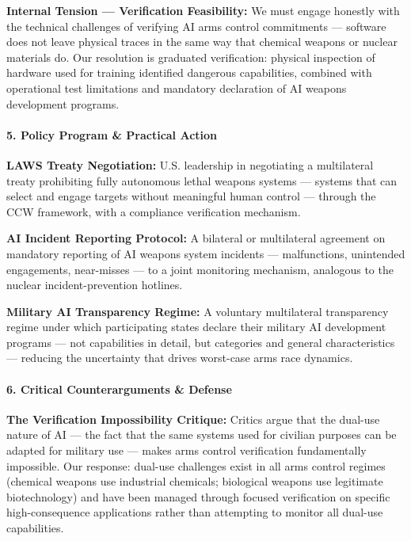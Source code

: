 \textbf{Internal Tension --- Verification Feasibility:} We must engage
honestly with the technical challenges of verifying AI arms control
commitments --- software does not leave physical traces in the same way
that chemical weapons or nuclear materials do. Our resolution is
graduated verification: physical inspection of hardware used for
training identified dangerous capabilities, combined with operational
test limitations and mandatory declaration of AI weapons development
programs.

\paragraph{5. Policy Program \& Practical
Action}\label{policy-program-practical-action-25}

\textbf{LAWS Treaty Negotiation:} U.S. leadership in negotiating a
multilateral treaty prohibiting fully autonomous lethal weapons systems
--- systems that can select and engage targets without meaningful human
control --- through the CCW framework, with a compliance verification
mechanism.

\textbf{AI Incident Reporting Protocol:} A bilateral or multilateral
agreement on mandatory reporting of AI weapons system incidents ---
malfunctions, unintended engagements, near-misses --- to a joint
monitoring mechanism, analogous to the nuclear incident-prevention
hotlines.

\textbf{Military AI Transparency Regime:} A voluntary multilateral
transparency regime under which participating states declare their
military AI development programs --- not capabilities in detail, but
categories and general characteristics --- reducing the uncertainty that
drives worst-case arms race dynamics.

\paragraph{6. Critical Counterarguments \&
Defense}\label{critical-counterarguments-defense-25}

\textbf{The Verification Impossibility Critique:} Critics argue that the
dual-use nature of AI --- the fact that the same systems used for
civilian purposes can be adapted for military use --- makes arms control
verification fundamentally impossible. Our response: dual-use challenges
exist in all arms control regimes (chemical weapons use industrial
chemicals; biological weapons use legitimate biotechnology) and have
been managed through focused verification on specific high-consequence
applications rather than attempting to monitor all dual-use
capabilities.

